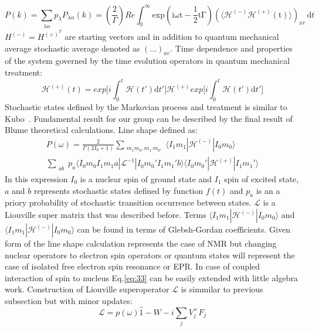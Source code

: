 \begin{equation}\label{eq:31}
P(k)=\sum_{\substack{\lambda\alpha}}p_{\lambda}P_{\lambda\alpha}(k)= \left(\frac{2}{\Gamma}\right)Re \int_0^\infty\mathrm{exp(i\omega t-\frac{1}{2}t\Gamma) (\langle \mathcal{H}^{(-)}\mathcal{H}^{(+)}(t) \rangle)_{av} }\,\mathrm{d}t
\end{equation}     
$H^{(-)}=H^{(+)^T}$ are starting vectors and in addition to quantum mechanical average stochastic average denoted as $(...)_{av}$. Time dependence and properties of the system governed by the time evolution operators in quantum mechanical treatment: 
\begin{equation}\label{eq:32}
\mathcal{H}^{(+)}(t)= exp\Bigg[i\int_0^t\mathcal{H}(t')\mathrm{d}t'\Bigg]\mathcal{H}^{(+)}exp\Bigg[i\int_0^t\mathcal{H}(t')\mathrm{d}t'\Bigg]
\end{equation}  
Stochastic states defined by the Markovian process and treatment is similar to Kubo~\cite{kubo1}. Fundamental result for our group can be described by the final result of Blume theoretical calculations. Line shape defined as: 
\begin{multline}\label{eq:33}
P(\omega)=
\frac{2}{\Gamma(2I_0+1)}\sum_{\substack{m_1m_0,m_{1'}m_{0'}}}\langle I_1m_1|\mathcal{H}^{(-)}|I_0m_0\rangle\\\sum_{\substack{ab}}p_a\langle I_0m_0I_1m_1a|\mathcal{L}^{-1}|I_0m_0'I_1m_1'b\rangle \langle I_0m_0'|\mathcal{H}^{(+)}|I_1m_1'\rangle
\end{multline}
In this expression $I_0$ is a nuclear spin of ground state and $I_1$ spin of excited state,$a$ and $b$ represents stochastic states defined by function $f(t)$ and $p_a$ is an a priory probability of stochastic transition occurrence between states. $\mathcal{L}$ is a Liouville super matrix that was described before. Terms 
$\langle I_1m_1|\mathcal{H}^{(-)}|I_0m_0\rangle $ and $\langle I_1m_1|\mathcal{H}^{(-)}|I_0m_0\rangle $ can be found in terms of Glebsh-Gordan coefficients. Given form of the line shape calculation represents the case of NMR but changing nuclear operators to electron spin operators or quantum states will represent the case of isolated free electron spin resonance or EPR. In case of coupled interaction of spin to nucleus Eq.\ref{eq:33} can be easily extended with little algebra work. Construction of Liouville superoperator $\mathcal{L}$ is simmilar to previous subsection but with minor updates: 
\begin{equation}\label{eq:34}
\mathcal{L}=p(\omega)\hat1 - W-i\sum_jV_j^{\times} F_j
\end{equation}
